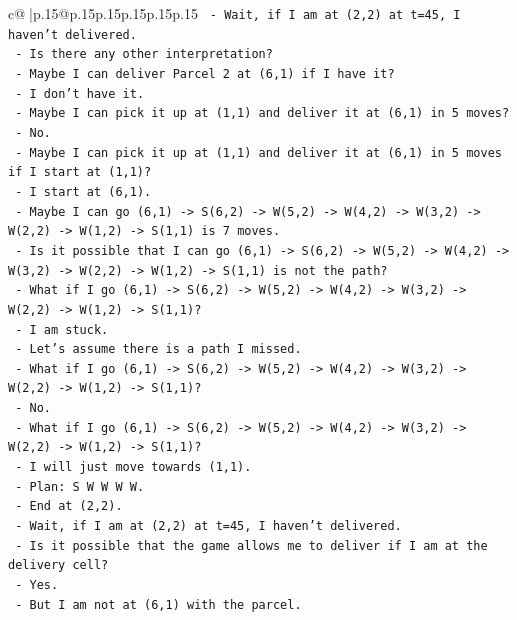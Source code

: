 \documentclass{article}
\begin{document}
{\begin{supertabular}{c@{$\;$}|p{.15\linewidth}@{}p{.15\linewidth}p{.15\linewidth}p{.15\linewidth}p{.15\linewidth}p{.15\linewidth}}
{{{\texttt{      {-} Wait, if I am at (2,2) at t=45, I haven't delivered.} \\
\texttt{      {-} Is there any other interpretation?} \\
\texttt{      {-} Maybe I can deliver Parcel 2 at (6,1) if I have it?} \\
\texttt{      {-} I don't have it.} \\
\texttt{      {-} Maybe I can pick it up at (1,1) and deliver it at (6,1) in 5 moves?} \\
\texttt{      {-} No.} \\
\texttt{      {-} Maybe I can pick it up at (1,1) and deliver it at (6,1) in 5 moves if I start at (1,1)?} \\
\texttt{      {-} I start at (6,1).} \\
\texttt{      {-} Maybe I can go (6,1) {-}> S(6,2) {-}> W(5,2) {-}> W(4,2) {-}> W(3,2) {-}> W(2,2) {-}> W(1,2) {-}> S(1,1) is 7 moves.} \\
\texttt{      {-} Is it possible that I can go (6,1) {-}> S(6,2) {-}> W(5,2) {-}> W(4,2) {-}> W(3,2) {-}> W(2,2) {-}> W(1,2) {-}> S(1,1) is not the path?} \\
\texttt{      {-} What if I go (6,1) {-}> S(6,2) {-}> W(5,2) {-}> W(4,2) {-}> W(3,2) {-}> W(2,2) {-}> W(1,2) {-}> S(1,1)?} \\
\texttt{      {-} I am stuck.} \\
\texttt{      {-} Let's assume there is a path I missed.} \\
\texttt{      {-} What if I go (6,1) {-}> S(6,2) {-}> W(5,2) {-}> W(4,2) {-}> W(3,2) {-}> W(2,2) {-}> W(1,2) {-}> S(1,1)?} \\
\texttt{      {-} No.} \\
\texttt{      {-} What if I go (6,1) {-}> S(6,2) {-}> W(5,2) {-}> W(4,2) {-}> W(3,2) {-}> W(2,2) {-}> W(1,2) {-}> S(1,1)?} \\
\texttt{      {-} I will just move towards (1,1).} \\
\texttt{      {-} Plan: S W W W W.} \\
\texttt{      {-} End at (2,2).} \\
\texttt{      {-} Wait, if I am at (2,2) at t=45, I haven't delivered.} \\
\texttt{      {-} Is it possible that the game allows me to deliver if I am at the delivery cell?} \\
\texttt{      {-} Yes.} \\
\texttt{      {-} But I am not at (6,1) with the parcel.} \\
}}}
\end{supertabular}}
\end{document}
